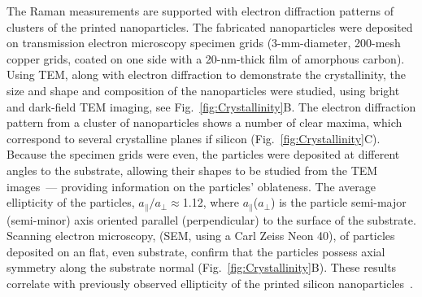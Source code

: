                 The Raman measurements are supported with electron diffraction patterns of clusters of the printed nanoparticles. The fabricated nanoparticles
            were deposited on transmission electron microscopy specimen grids (3-mm-diameter, 200-mesh copper grids, coated on one side with a 20-nm-thick
            film of amorphous carbon). Using TEM, along with electron diffraction to demonstrate the crystallinity, the size and shape and composition
            of the nanoparticles were studied, using bright and dark-field TEM imaging, see Fig.~\ref{fig:Crystallinity}B.
                The electron diffraction pattern from a cluster of nanoparticles shows a number of clear maxima, which correspond to several crystalline planes
            if silicon (Fig.~\ref{fig:Crystallinity}C). Because the specimen grids were even, the particles were deposited at different angles to the substrate,
            allowing their shapes to be studied from the TEM images~--- providing information on the particles' oblateness. The average ellipticity
            of the particles, $a_{\parallel}/a_{\perp}\approx$1.12, where $a_{\parallel}$($a_{\perp}$) is the particle semi-major
            (semi-minor) axis oriented parallel (perpendicular) to the surface of the substrate. Scanning electron microscopy, (SEM, using a Carl Zeiss Neon 40),
            of particles deposited on an flat, even substrate, confirm that the particles possess axial symmetry along the substrate
            normal (Fig.~\ref{fig:Crystallinity}B). These results correlate with previously observed ellipticity of the printed silicon
            nanoparticles~\cite{zywietz2014laser}.

